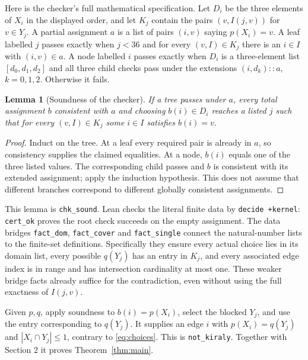 \documentclass[11pt]{article}
\newtheorem{lemma}{Lemma}
\begin{document}
Here is the checker's full mathematical specification. Let $D_i$ be the three elements of $X_i$ in the displayed order, and let $K_j$ contain the pairs $(v,I(j,v))$ for $v\in Y_j$. A partial assignment $a$ is a list of pairs $(i,v)$ saying $p(X_i)=v$. A leaf labelled $j$ passes exactly when $j<36$ and for every $(v,I)\in K_j$ there is an $i\in I$ with $(i,v)\in a$. A node labelled $i$ passes exactly when $D_i$ is a three-element list $[d_0,d_1,d_2]$ and all three child checks pass under the extensions $(i,d_k)::a$, $k=0,1,2$. Otherwise it fails.

\begin{lemma}[Soundness of the checker]
If a tree passes under $a$, every total assignment $b$ consistent with $a$ and choosing $b(i)\in D_i$ reaches a listed $j$ such that for every $(v,I)\in K_j$ some $i\in I$ satisfies $b(i)=v$.
\end{lemma}
\begin{proof}
Induct on the tree. At a leaf every required pair is already in $a$, so consistency supplies the claimed equalities. At a node, $b(i)$ equals one of the three listed values. The corresponding child passes and $b$ is consistent with its extended assignment; apply the induction hypothesis. This does not assume that different branches correspond to different globally consistent assignments.
\end{proof}
This lemma is \texttt{chk\_sound}. Lean checks the literal finite data by \texttt{decide +kernel}: \texttt{cert\_ok} proves the root check succeeds on the empty assignment. The data bridges \texttt{fact\_dom}, \texttt{fact\_cover} and \texttt{fact\_single} connect the natural-number lists to the finite-set definitions. Specifically they ensure every actual choice lies in its domain list, every possible $q(Y_j)$ has an entry in $K_j$, and every associated edge index is in range and has intersection cardinality at most one. These weaker bridge facts already suffice for the contradiction, even without using the full exactness of $I(j,v)$.

Given $p,q$, apply soundness to $b(i)=p(X_i)$, select the blocked $Y_j$, and use the entry corresponding to $q(Y_j)$. It supplies an edge $i$ with $p(X_i)=q(Y_j)$ and $|X_i\cap Y_j|\leq1$, contrary to \eqref{eq:choices}. This is \texttt{not\_kiraly}. Together with Section 2 it proves Theorem~\ref{thm:main}.
\end{document}
